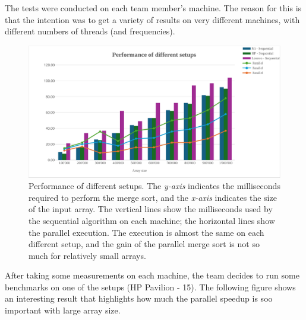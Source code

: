 \documentclass[a4paper]{article}
\begin{document}
    The tests were conducted on each team member's machine. The reason for this is that the intention was to get a variety of results on very different machines, with different numbers of threads (and frequencies).
    \begin{figure}[!htp]
        \centering
        \includegraphics[width=.92\textwidth]{../benchmark/different-setup-benchmark.pdf}
        \caption{Performance of different setups. The \emph{y-axis} indicates the milliseconds required to perform the merge sort, and the \emph{x-axis} indicates the size of the input array. The vertical lines show the milliseconds used by the sequential algorithm on each machine; the horizontal lines show the parallel execution. The execution is almost the same on each different setup, and the gain of the parallel merge sort is not so much for relatively small arrays.}
    \end{figure}

    \noindent
    After taking some measurements on each machine, the team decides to run some benchmarks on one of the setups (HP Pavilion - 15). The following figure shows an interesting result that highlights how much the parallel speedup is soo important with large array size.
\end{document}
